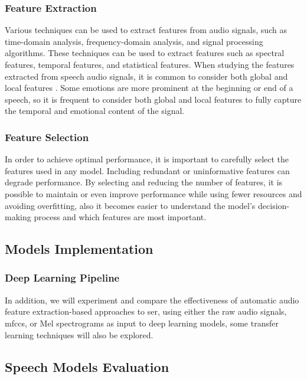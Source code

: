 \subsubsection{Feature Extraction}

Various techniques can be used to extract features from audio signals, such as time-domain analysis, frequency-domain analysis, and signal processing algorithms. These techniques can be used to extract features such as spectral features, temporal features, and statistical features. When studying the features extracted from speech audio signals, it is common to consider both global and local features \cite{PORIA201798}. Some emotions are more prominent at the beginning or end of a speech, so it is frequent to consider both global and local features to fully capture the temporal and emotional content of the signal.

\subsubsection{Feature Selection}

In order to achieve optimal performance, it is important to carefully select the features used in any model. Including redundant or uninformative features can degrade performance. By selecting and reducing the number of features, it is possible to maintain or even improve performance while using fewer resources and avoiding overfitting, also it becomes easier to understand the model's decision-making process and which features are most important.

\subsection{Models Implementation}

\subsubsection{Deep Learning Pipeline}

In addition, we will experiment and compare the effectiveness of automatic audio feature extraction-based approaches to \ac{ser}, using either the raw audio signals, \ac{mfccs}, or Mel spectrograms as input to deep learning models, some transfer learning techniques will also be explored.

\subsection{Speech Models Evaluation}

